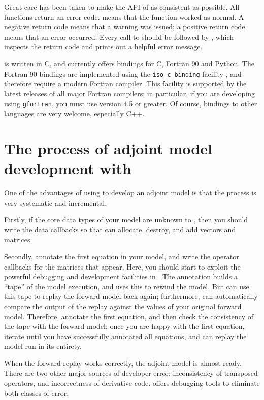 Great care has been taken to make the API of \libadjoint as consistent as possible. All functions
return an error code.  means that the function worked as normal. A negative
return code means that a warning was issued; a positive return code means that an error occurred.
Every call to \libadjoint should be followed by , which inspects the return
code and prints out a helpful error message.

\libadjoint is written in C, and currently offers bindings for C, Fortran 90 and Python. The Fortran 90 bindings
are implemented using the \texttt{iso_c_binding} facility \citep{metcalf2004}, and therefore require a modern
Fortran compiler. This facility is supported by the latest releases of all major Fortran compilers; in particular,
if you are developing using \texttt{gfortran}, you must use version 4.5 or greater.
Of course, bindings to other languages are very welcome, especially C++.

\section{The process of adjoint model development with \libadjoint}
One of the advantages of using \libadjoint to develop an adjoint model is that the process
is very systematic and incremental. 

Firstly, if the core data types of your model are unknown to \libadjoint, then you
should write the data callbacks so that \libadjoint can allocate, destroy, and add
vectors and matrices.

Secondly, annotate the first equation in your model, and write the operator
callbacks for the matrices that appear. Here, you should start to
exploit the powerful debugging and development facilities in \libadjoint. The
annotation builds a ``tape'' of the model execution, and \libadjoint uses this
to rewind the model. But \libadjoint can use this tape to replay the forward
model back again; furthermore, \libadjoint can automatically compare the output
of the replay against the values of your original forward model. Therefore,
annotate the first equation, and then check the consistency of the tape with the
forward model; once you are happy with the first equation, iterate until you have
successfully annotated all equations, and can replay the model run in its
entirety.

When the forward replay works correctly, the adjoint model is almost ready.
There are two other major sources of developer error: inconsistency of
transposed operators, and incorrectness of derivative code. \libadjoint
offers debugging tools to eliminate both classes of error. 

